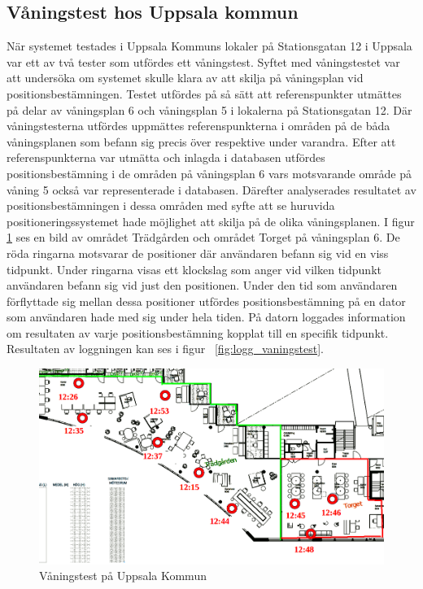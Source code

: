 \documentclass[swedish, a4paper,12pt]{article}
\begin{document}
\subsection{Våningstest hos Uppsala kommun}
När systemet testades i Uppsala Kommuns lokaler på Stationsgatan 12 i Uppsala var ett av två tester som utfördes ett våningstest. Syftet med våningstestet var att undersöka om systemet skulle klara av att skilja på våningsplan vid positionsbestämningen. Testet utfördes på så sätt att referenspunkter utmättes på delar av våningsplan 6 och våningsplan 5 i lokalerna på Stationsgatan 12. Där våningstesterna utfördes uppmättes referenspunkterna i områden på de båda våningsplanen som befann sig precis över respektive under varandra. Efter att referenspunkterna var utmätta och inlagda i databasen utfördes positionsbestämning i de områden på våningsplan 6 vars motsvarande område på våning 5 också var representerade i databasen. Därefter analyserades resultatet av positionsbestämningen i dessa områden med syfte att se huruvida positioneringssystemet hade möjlighet att skilja på de olika våningsplanen. I figur \ref{fig:vanings_test} ses en bild av området Trädgården och området Torget på våningsplan 6. De röda ringarna motsvarar de positioner där användaren befann sig vid en viss tidpunkt. Under ringarna visas ett klockslag som anger vid vilken tidpunkt användaren befann sig vid just den positionen. Under den tid som användaren förflyttade sig mellan dessa positioner utfördes positionsbestämning på en dator som användaren hade med sig under hela tiden. På datorn loggades information om resultaten av varje positionsbestämning kopplat till en specifik tidpunkt. Resultaten av loggningen kan ses i figur ~\ref{fig:logg_vaningstest}.

\begin{figure}[H]
  \centering
  \includegraphics[width=15cm]{media/vaningstest_uppsala_kommun_2.png}
  \caption{Våningstest på Uppsala Kommun}
  \label{fig:vanings_test}
\end{figure}
\end{document}
